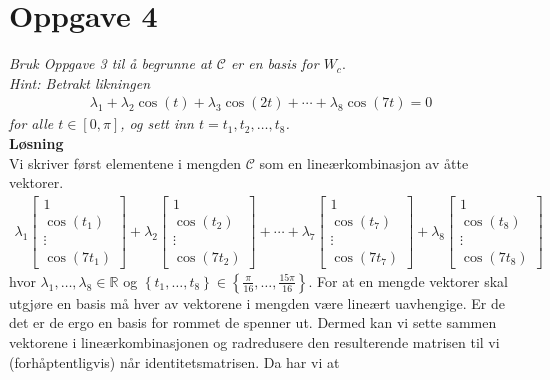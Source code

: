 \documentclass[12pt,
               a4paper,
               article,
               oneside,
               oldfontcommands,
               norsk]{memoir}
\begin{document}
\section*{Oppgave 4}
\emph{Bruk Oppgave 3 til å begrunne at $\mathcal{C}$ er en basis for $W_{c}.$ \vspace{2mm}\\Hint: Betrakt likningen}
\begin{align*}
\lambda_{1} + \lambda_{2}\cos(t) + \lambda_{3}\cos(2t) + \cdots + \lambda_{8}\cos(7t) = 0
\end{align*}
\emph{for alle $t \in [0, \pi]$, og sett inn $t = t_{1}, t_{2}, \ldots, t_{8}$.}\vspace{3mm}\\
\textbf{Løsning}\vspace{3mm}\\
Vi skriver først elementene i mengden $\mathcal{C}$ som en lineærkombinasjon av åtte vektorer.
\begin{align}
\label{eqn:vektor}
\lambda_{1} \begin{bmatrix}
1 \\[3pt]
\cos(t_{1})\\[4pt]
\vdots\\
\cos(7t_{1})
\end{bmatrix} + 
\lambda_{2} \begin{bmatrix}
1 \\[3pt]
\cos(t_{2})\\[4pt]
\vdots\\
\cos(7t_{2})
\end{bmatrix}
+
\cdots
+
\lambda_{7} \begin{bmatrix}
1 \\[3pt]
\cos(t_{7})\\[4pt]
\vdots\\
\cos(7t_{7})
\end{bmatrix}
+\lambda_{8} \begin{bmatrix}
1 \\[3pt]
\cos(t_{8})\\[4pt]
\vdots\\
\cos(7t_{8})
\end{bmatrix}
\end{align}
hvor $\lambda_{1}, \ldots, \lambda_{8} \in \mathbb{R}$ og $\left\{t_1, \ldots, t_{8} \right\} \in \left\{\frac{\pi}{16}, \ldots, \frac{15\pi}{16} \right\}$. For at en mengde vektorer skal utgjøre en basis må hver av vektorene i mengden være lineært uavhengige. Er de det er de ergo en basis for rommet de spenner ut. Dermed kan vi sette sammen vektorene i lineærkombinasjonen og radredusere den resulterende matrisen til vi (forhåptentligvis) når identitetsmatrisen. Da har vi at
\end{document}
